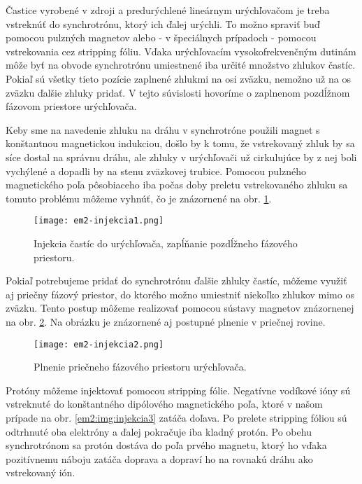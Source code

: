 \documentclass[../../main.tex]{subfiles}
\begin{document}
Častice vyrobené v zdroji a predurýchlené lineárnym urýchľovačom je treba vstreknúť do synchrotrónu, ktorý ich ďalej urýchli. To možno spraviť buď pomocou pulzných magnetov alebo - v špeciálnych prípadoch - pomocou vstrekovania cez stripping fóliu. Vďaka urýchľovacím vysokofrekvenčným dutinám môže byť na obvode synchrotrónu umiestnené iba určité množstvo zhlukov častíc. Pokiaľ sú všetky tieto pozície zaplnené zhlukmi na osi zväzku, nemožno už na os zväzku ďalšie zhluky pridať. V tejto súvislosti hovoríme o zaplnenom pozdĺžnom fázovom priestore urýchľovača.

Keby sme na navedenie zhluku na dráhu v synchrotróne použili magnet s konštantnou magnetickou indukciou, došlo by k tomu, že vstrekovaný zhluk by sa síce dostal na správnu dráhu, ale zhluky v urýchľovači už cirkulujúce by z nej boli vychýlené a dopadli by na stenu zväzkovej trubice. Pomocou pulzného magnetického poľa pôsobiaceho iba počas doby preletu vstrekovaného zhluku sa tomuto problému môžeme vyhnúť, čo je znázornené na obr. \ref{em2:img:injekcia1}.

\begin{figure}[h]
\centering
\texttt{[image: em2-injekcia1.png]}
\caption{Injekcia častíc do urýchľovača, zapĺňanie pozdĺžneho fázového priestoru.}
\label{em2:img:injekcia1}
\end{figure}

Pokiaľ potrebujeme pridať do synchrotrónu ďalšie zhluky častíc, môžeme využiť aj priečny fázový priestor, do ktorého možno umiestniť niekoľko zhlukov mimo os zväzku. Tento postup môžeme realizovať pomocou sústavy magnetov znázornenej na obr. \ref{em2:img:injekcia2}. Na obrázku je znázornené aj postupné plnenie v priečnej rovine.

\begin{figure}[h]
\centering
\texttt{[image: em2-injekcia2.png]}
\caption{Plnenie priečneho fázového priestoru urýchľovača.}
\label{em2:img:injekcia2}
\end{figure}

Protóny môžeme injektovať pomocou stripping fólie. Negatívne vodíkové ióny sú vstreknuté do konštantného dipólového magnetického poľa, ktoré v našom prípade na obr. \ref{em2:img:injekcia3} zatáča doľava. Po prelete stripping fóliou sú odtrhnuté oba elektróny a ďalej pokračuje iba kladný protón. Po obehu synchrotrónom sa protón dostáva do poľa prvého magnetu, ktorý ho vďaka pozitívnemu náboju zatáča doprava a dopraví ho na rovnakú dráhu ako vstrekovaný ión.
\end{document}
